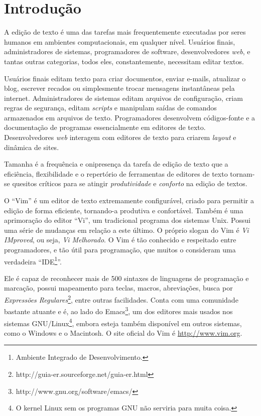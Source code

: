 
\chapter{Introdução}

A edição de texto é uma das tarefas mais frequentemente executadas por seres
humanos em ambientes computacionais, em qualquer nível. Usuários finais,
administradores de sistemas, programadores de software, desenvolvedores {\em
web}, e tantas outras categorias, todos eles, constantemente, necessitam
editar textos. 

Usuários finais editam texto para criar documentos, enviar e-mails, atualizar
o blog, escrever recados ou simplesmente trocar mensagens instantâneas pela
internet. Administradores de sistemas editam arquivos de configuração, criam
regras de segurança, editam {\em scripts} e manipulam saídas de comandos
armazenados em arquivos de texto. Programadores desenvolvem códigos-fonte e a
documentação de programas essencialmente em editores de texto.  Desenvolvedores {\em web}
interagem com editores de texto para criarem {\em layout} e dinâmica de sites.

Tamanha é a frequência e onipresença da tarefa de edição de texto que a
eficiência, flexibilidade e o repertório de ferramentas de editores de texto
tornam-se quesitos críticos para se atingir {\em produtividade} e {\em
conforto} na edição de textos.


O ``Vim'' é um editor de texto extremamente configurável, criado para
permitir a edição de forma eficiente, tornando-a produtiva e confortável. 
Também é uma aprimoração do editor ``Vi'', um tradicional programa dos
sistemas Unix. Possui uma série de mudanças em relação a este último. O
próprio slogan do Vim é {\em Vi IMproved}, ou seja, {\em Vi Melhorado}.  O Vim
é tão conhecido e respeitado entre programadores, e tão útil para programação,
que muitos o consideram uma verdadeira ``IDE\footnote{Ambiente Integrado de
Desenvolvimento.}''.

Ele é capaz de reconhecer mais de 500 sintaxes de linguagens de programação e
marcação, possui mapeamento para teclas, macros, abreviações, busca por
{\em{Expressões
Regulares}}\footnote{http://guia-er.sourceforge.net/guia-er.html}, entre
outras facilidades. Conta com uma comunidade bastante atuante e é, ao lado do
Emacs\footnote{http://www.gnu.org/software/emacs/}, um dos editores mais usados
nos sistemas GNU/Linux\footnote{O kernel Linux sem os programas GNU não
serviria para muita coisa.}, embora esteja também disponível em outros sistemas,
como o Windows e o Macintosh. O site oficial do Vim é \url{http://www.vim.org}.

